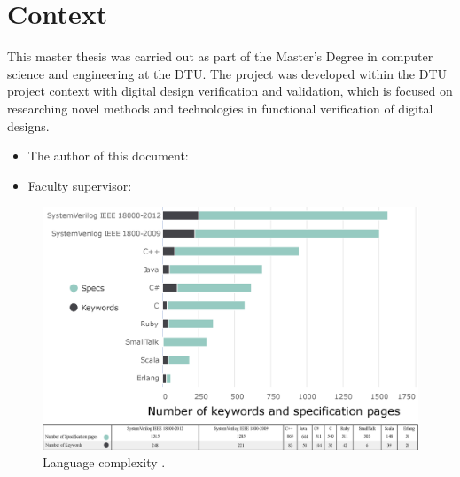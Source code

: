 \section{Context}
This master thesis was carried out as part of the Master’s Degree in computer
science and engineering at the DTU. The project was developed within the DTU
project context with digital design verification and validation, which is
focused on researching novel methods and technologies in functional verification
of digital designs.

\begin{itemize}
    \item The author of this document: \thesisauthor
    \item Faculty supervisor: \thesissupervisor
\end{itemize}

\begin{figure}[!h]
\centering
\includegraphics[width=\linewidth]{pictures/Complexity_of_a_language.eps}
\caption{Language complexity \cite{presentation:cerncocotb}.}
\label{fig:languagecomplexity}
\end{figure}

